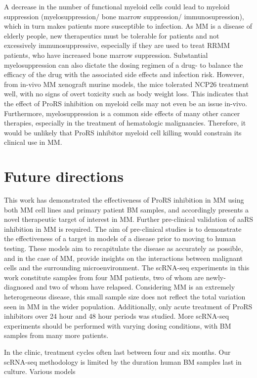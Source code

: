A decrease in the number of functional myeloid cells could lead to myeloid suppression (myelosuppression/ bone marrow suppression/ immunosupression), which in turn makes patients more susceptible to infection.
As MM is a disease of elderly people, new therapeutics must be tolerable for patients and not excessively immunosuppressive, especially if they are used to treat RRMM patients, who have increased bone marrow suppression.
Substantial myelosuppression can also dictate the dosing regimen of a drug- to balance the efficacy of the drug with the associated side effects and infection risk.
However, from in-vivo MM xenograft murine models\cite{bottpreclinical2022}, the mice tolerated NCP26 treatment well, with no signs of overt toxicity such as body weight loss.
This indicates that the effect of ProRS inhibition on myeloid cells may not even be an issue in-vivo.
Furthermore, myelosuppression is a common side effects of many other cancer therapies, especially in the treatment of hematologic malignancies.
Therefore, it would be unlikely that ProRS inhibitor myeloid cell killing would constrain its clinical use in MM\@.

\section{Future directions}
This work has demonstrated the effectiveness of ProRS inhibition in MM using both MM cell lines and primary patient BM samples, and accordingly presents a novel therapeutic target of interest in MM\@.
Further pre-clinical validation of aaRS inhibition in MM is required.
The aim of pre-clinical studies is to demonstrate the effectiveness of a target in models of a disease prior to moving to human testing.
These models aim to recapitulate the disease as accurately as possible, and in the case of MM, provide insights on the interactions between malignant cells and the surrounding microenvironment.
The scRNA-seq experiments in this work constitute samples from four MM patients, two of whom are newly-diagnosed and two of whom have relapsed.
Considering MM is an extremely heterogeneous disease, this small sample size does not reflect the total variation seen in MM in the wider population.
Additionally, only acute treatment of ProRS inhibitors over 24 hour and 48 hour periods was studied.
More scRNA-seq experiments should be performed with varying dosing conditions, with BM samples from many more patients.

In the clinic, treatment cycles often last between four and six months.
Our scRNA-seq methodology is limited by the duration human BM samples last in culture.
Various models


